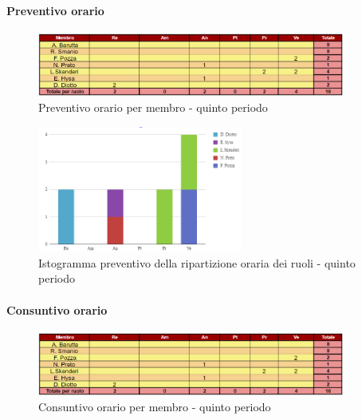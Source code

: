 \paragraph{Preventivo orario} \hspace{1pt}

\begin{figure}[H]
    \centering
    \includegraphics[width=0.9\textwidth]{../Images/preventivoOrario5Periodo.png}
    \caption{Preventivo orario per membro - quinto periodo}
    \label{fig:Preventivo_orario_5}
\end{figure}

\begin{figure}[H]
    \centering
    \includegraphics[width=0.6\textwidth]{../Images/preventivoDivisioneRuoli5Periodo.png}
    \caption{Istogramma preventivo della ripartizione oraria dei ruoli - quinto periodo}
    \label{fig:Preventivo_ripartizione_oraria_5}
\end{figure}

\paragraph{Consuntivo orario } \hspace{1pt}

\begin{figure}[H]
    \centering
    \includegraphics[width=0.9\textwidth]{../Images/consuntivoOrario5Periodo.png}
    \caption{Consuntivo orario per membro - quinto periodo}
    \label{fig:Constuntivo_orario_5}
\end{figure}


